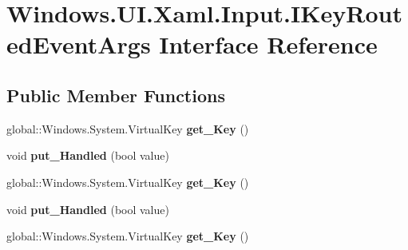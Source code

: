 \hypertarget{interface_windows_1_1_u_i_1_1_xaml_1_1_input_1_1_i_key_routed_event_args}{}\section{Windows.\+U\+I.\+Xaml.\+Input.\+I\+Key\+Routed\+Event\+Args Interface Reference}
\label{interface_windows_1_1_u_i_1_1_xaml_1_1_input_1_1_i_key_routed_event_args}
\subsection*{Public Member Functions}
\begin{DoxyCompactItemize}
\item 
\mbox{\label{interface_windows_1_1_u_i_1_1_xaml_1_1_input_1_1_i_key_routed_event_args_af71b8e3e01507ea31eecd6cf063776ef}} 
global\+::\+Windows.\+System.\+Virtual\+Key {\bfseries get\+\_\+\+Key} ()
\item 
\mbox{\label{interface_windows_1_1_u_i_1_1_xaml_1_1_input_1_1_i_key_routed_event_args_af336087f59825d61c5832fc56822c1da}} 
void {\bfseries put\+\_\+\+Handled} (bool value)
\item 
\mbox{\label{interface_windows_1_1_u_i_1_1_xaml_1_1_input_1_1_i_key_routed_event_args_af71b8e3e01507ea31eecd6cf063776ef}} 
global\+::\+Windows.\+System.\+Virtual\+Key {\bfseries get\+\_\+\+Key} ()
\item 
\mbox{\label{interface_windows_1_1_u_i_1_1_xaml_1_1_input_1_1_i_key_routed_event_args_af336087f59825d61c5832fc56822c1da}} 
void {\bfseries put\+\_\+\+Handled} (bool value)
\item 
\mbox{\label{interface_windows_1_1_u_i_1_1_xaml_1_1_input_1_1_i_key_routed_event_args_af71b8e3e01507ea31eecd6cf063776ef}} 
global\+::\+Windows.\+System.\+Virtual\+Key {\bfseries get\+\_\+\+Key} ()
\item 

\end{DoxyCompactItemize}
